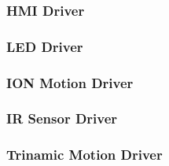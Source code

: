 \subsubsection{HMI Driver}

\subsubsection{LED Driver}

\subsubsection{ION Motion Driver}

\subsubsection{IR Sensor Driver}

\subsubsection{Trinamic Motion Driver}